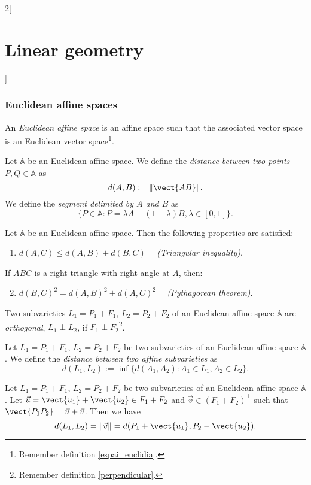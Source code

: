 \documentclass[../../../main.tex]{subfiles}
\begin{document}
\begin{multicols}{2}[\section{Linear geometry}]
\subsubsection*{Euclidean affine spaces}
\begin{definition}
An \textit{Euclidean affine space} is an affine space such that the associated vector space is an Euclidean vector space\footnote{Remember definition \ref{espai_euclidia}.}.
\end{definition}
\begin{definition}
Let $\mathbb{A}$ be an Euclidean affine space. We define the \textit{distance between two points $P,Q\in\mathbb{A}$} as $$d(A,B):=\|\vect{AB}\|.$$ We define the \textit{segment delimited by $A$ and $B$} as $$\{P\in\mathbb{A}:P=\lambda A+(1-\lambda)B,\lambda\in[0,1]\}.$$
\end{definition}
\begin{prop}
Let $\mathbb{A}$ be an Euclidean affine space. Then the following properties are satisfied:
\begin{enumerate}
    \item $d(A,C)\leq d(A,B)+d(B,C)\quad$ \textit{(Triangular inequality)}.
\end{enumerate}
If $ABC$ is a right triangle with right angle at $A$, then:
\begin{enumerate}
    \setcounter{enumi}{1}
    \item $d(B,C)^2=d(A,B)^2+d(A,C)^2\quad$ \textit{(Pythagorean theorem)}.
\end{enumerate}
\end{prop}
\begin{definition}
Two subvarieties $L_1=P_1+F_1$, $L_2=P_2+F_2$ of an Euclidean affine space $\mathbb{A}$ are \textit{orthogonal}, $L_1\perp L_2$, if $F_1\perp F_2$\footnote{Remember definition \ref{perpendicular}.}.
\end{definition}
\begin{definition}
Let $L_1=P_1+F_1$, $L_2=P_2+F_2$ be two subvarieties of an Euclidean affine space $\mathbb{A}$. We define the \textit{distance between two affine subvarieties} as $$d(L_1,L_2):=\inf\{d(A_1,A_2):A_1\in L_1, A_2\in L_2\}.$$
\end{definition}
\begin{theorem}
Let $L_1=P_1+F_1$, $L_2=P_2+F_2$ be two subvarieties of an Euclidean affine space $\mathbb{A}$. Let $\vec{u}=\vect{u_1}+\vect{u_2}\in F_1+F_2$ and $\vec{v}\in(F_1+F_2)^\perp$ such that $\vect{P_1P_2}=\vec{u}+\vec{v}$. Then we have $$d(L_1,L_2)=\|\vec{v}\|=d(P_1+\vect{u_1},P_2-\vect{u_2}).$$
\end{theorem}

\end{multicols}
\end{document}

